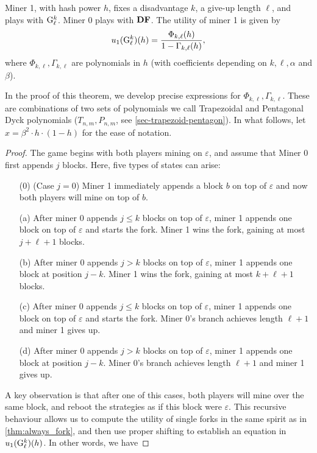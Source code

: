 \begin{mythm}
Miner 1, with hash power $h$, fixes a disadvantage $k$, a give-up length $\ell$, and plays with ${\rm {G}}^k_\ell$. Miner 0 plays with $\text{\rm {\bf DF}}$. 
The utility of miner 1 is given by
$$
u_1({\rm {G}}^k_\ell)(h) = \frac{\Phi_{k,\ell}(h)}{1-\Gamma_{k,\ell}(h)},
$$
where $\Phi_{k,\ell},\Gamma_{k,\ell}$ are polynomials in $h$ (with coefficients depending on $k,\ell,\alpha$ and $\beta$).
\end{mythm}
In the proof of this theorem, we develop precise expressions for $\Phi_{k,\ell}, \Gamma_{k,\ell}$. These are combinations of two sets of polynomials we call Trapezoidal and Pentagonal Dyck polynomials ($T_{n,m}, P_{n,m}$, see \ref{sec-trapezoid-pentagon}). In what follows, let $x = \beta^2 \cdot h \cdot (1 - h)$ for the ease of notation.
\begin{proof}
The game begins with both players mining on $\varepsilon$, and assume that Miner 0 first appends $j$ blocks. Here, five types of states can arise:
\begin{itemize}
    \item[(0)] (Case $j=0$) Miner 1 immediately appends a block $b$ on top of $\varepsilon$ and now both players will mine on top of $b$.
    \item[(a)] After miner 0 appends $j\leq k$ blocks on top of $\varepsilon$, miner 1 appends one block on top of $\varepsilon$ and starts the fork. Miner 1 wins the fork, gaining at most $j+\ell+1$ blocks.
    \item[(b)] After miner 0 appends $j > k$ blocks on top of $\varepsilon$, miner 1 appends one block at position $j-k$. Miner 1 wins the fork, gaining at most $k+\ell+1$ blocks.
    \item[(c)] After miner 0 appends $j\leq k$ blocks on top of $\varepsilon$, miner 1 appends one block on top of $\varepsilon$ and starts the fork. Miner 0's branch achieves length $\ell+1$ and miner 1 gives up.
    \item[(d)] After miner 0 appends $j > k$ blocks on top of $\varepsilon$, miner 1 appends one block at position $j-k$. Miner 0's branch achieves length $\ell+1$ and miner 1 gives up.
\end{itemize}

A key observation is that after one of this cases, both players will mine over the same block, and reboot the strategies as if this block were $\varepsilon$. This recursive behaviour allows us to compute the utility of single forks in the same spirit as in \ref{thm:always_fork}, and then use proper shifting to establish an equation in $u_1({\rm {G}}^k_\ell)(h)$. In other words, we have


\end{proof}
